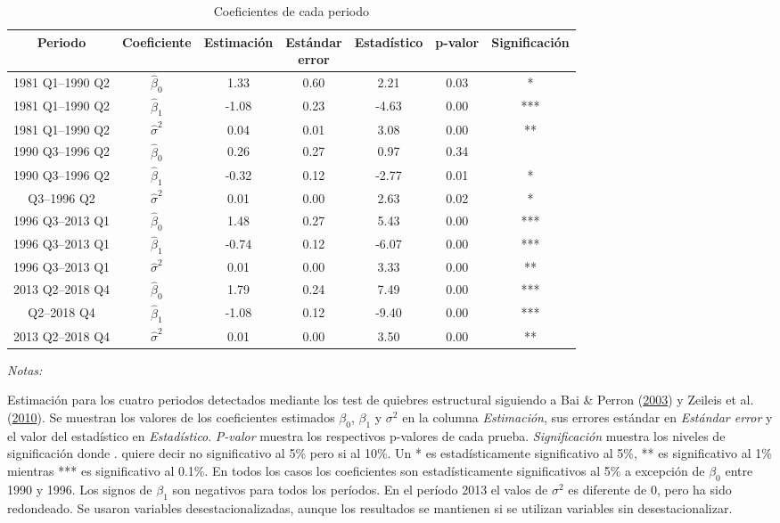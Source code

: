 \documentclass[12pt,oneside]{reedthesis}
\begin{document}
\begin{table}[!h]

\caption{\label{tab:vcovHAC-andrews}Coeficientes de cada periodo}
\centering
\fontsize{10}{12}\selectfont
\begin{threeparttable}
\begin{tabular}[t]{ccccccc}
\toprule
Periodo & Coeficiente & Estimación & \makecell[l]{Estándar\\error} & Estadístico & p-valor & Significación\\
\midrule
1981 Q1--1990 Q2 & $\hat{\beta}_0$ & 1.33 & 0.60 & 2.21 & 0.03 & *\\
1981 Q1--1990 Q2 & $\hat{\beta}_1$ & -1.08 & 0.23 & -4.63 & 0.00 & ***\\
1981 Q1--1990 Q2 & $\hat{\sigma}^2$ & 0.04 & 0.01 & 3.08 & 0.00 & **\\
1990 Q3--1996 Q2 & $\hat{\beta}_0$ & 0.26 & 0.27 & 0.97 & 0.34 & \\
1990 Q3--1996 Q2 & $\hat{\beta}_1$ & -0.32 & 0.12 & -2.77 & 0.01 & *\\
\addlinespace
1990 Q3--1996 Q2 & $\hat{\sigma}^2$ & 0.01 & 0.00 & 2.63 & 0.02 & *\\
1996 Q3--2013 Q1 & $\hat{\beta}_0$ & 1.48 & 0.27 & 5.43 & 0.00 & ***\\
1996 Q3--2013 Q1 & $\hat{\beta}_1$ & -0.74 & 0.12 & -6.07 & 0.00 & ***\\
1996 Q3--2013 Q1 & $\hat{\sigma}^2$ & 0.01 & 0.00 & 3.33 & 0.00 & **\\
2013 Q2--2018 Q4 & $\hat{\beta}_0$ & 1.79 & 0.24 & 7.49 & 0.00 & ***\\
\addlinespace
2013 Q2--2018 Q4 & $\hat{\beta}_1$ & -1.08 & 0.12 & -9.40 & 0.00 & ***\\
2013 Q2--2018 Q4 & $\hat{\sigma}^2$ & 0.01 & 0.00 & 3.50 & 0.00 & **\\
\bottomrule
\end{tabular}
\begin{tablenotes}
\item \textit{Notas:} 
\item \footnotesize Estimación para los cuatro periodos detectados mediante los test de quiebres estructural siguiendo a Bai \& Perron (\protect\hyperlink{ref-BaiPerron2003}{2003}) y Zeileis et al. (\protect\hyperlink{ref-Zeileis2010}{2010}). Se muestran los valores de los coeficientes estimados $\beta_0$, $\beta_1$ y $\sigma^2$ en la columna \textit{Estimación}, sus errores estándar en \textit{Estándar error} y el valor del estadístico en \textit{Estadístico}. \textit{P-valor} muestra los respectivos p-valores de cada prueba. \textit{Significación} muestra los niveles de significación donde . quiere decir no significativo al 5\% pero si al 10\%. Un * es estadísticamente significativo al 5\%, ** es significativo al 1\% mientras *** es significativo al 0.1\%. En todos los casos los coeficientes son estadísticamente significativos al 5\% a excepción de $\beta_0$ entre 1990 y 1996. Los signos de $\beta_1$ son negativos para todos los períodos. En el período 2013 el valos de $\sigma^2$ es diferente de 0, pero ha sido redondeado. Se usaron variables desestacionalizadas, aunque los resultados se mantienen si se utilizan variables sin desestacionalizar.


\end{tablenotes}
\end{threeparttable}
\end{table}
\end{document}
